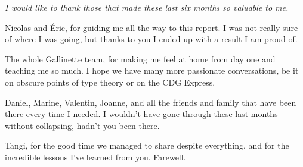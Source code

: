 \documentclass[en]{myarticle}
\DeclareMathOperator{\?}{?}
\begin{document}
{\thispagestyle{empty}
{\itshape\noindent\small
	I would like to thank those that made these last six months so valuable to me.
	
	Nicolas and Éric, for guiding me all the way to this report. I was not really sure of where I was going, but thanks to you I ended up with a result I am proud of.
	
	The whole Gallinette team, for making me feel at home from day one and teaching me so much. I hope we have many more passionate conversations, be it on obscure points of type theory or on the CDG Express.
	
	Daniel, Marine, Valentin, Joanne, and all the friends and family that have been there every time I needed. I wouldn't have gone through these last months without collapsing, hadn't you been there.
	
	Tangi, for the good time we managed to share despite everything, and for the incredible lessons I've learned from you. Farewell.
}
\cleardoublepage\setcounter{page}{1}




%	
%	

}
\end{document}
